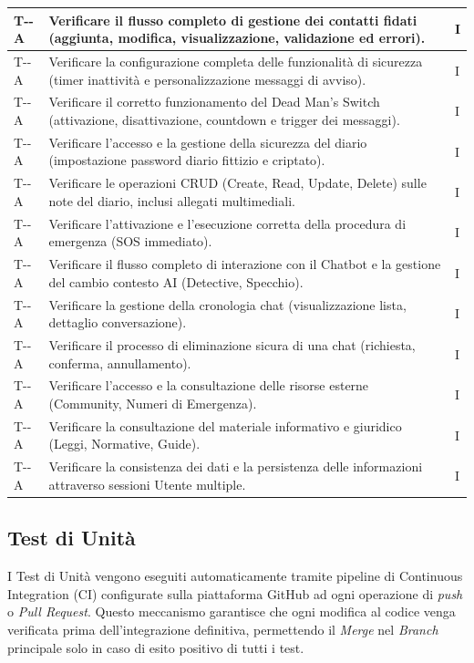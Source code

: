 \documentclass[a4paper,12pt]{article}
\newcounter{testacc}
\newcommand{\acctestcode}{T-\arabic{testacc}-A}
\newcommand{\ignoreglossary}{}
\begin{document}
\begin{longtable}{| >{\centering\arraybackslash}p{} | >{\raggedright\arraybackslash}p{} | >{\centering\arraybackslash}p{} |}
\stepcounter{testacc} \acctestcode & Verificare il flusso completo di gestione dei contatti fidati (aggiunta, modifica, visualizzazione, \ignoreglossary{validazione} ed errori). & I \\
\hline
\stepcounter{testacc} \acctestcode & Verificare la configurazione completa delle funzionalità di sicurezza (timer inattività e personalizzazione messaggi di avviso). & I \\
\hline
\stepcounter{testacc} \acctestcode & Verificare il corretto funzionamento del Dead Man's Switch (attivazione, disattivazione, countdown e trigger dei messaggi). & I \\
\hline
\stepcounter{testacc} \acctestcode & Verificare l'accesso e la gestione della sicurezza del diario (impostazione password diario fittizio e criptato). & I \\
\hline
\stepcounter{testacc} \acctestcode & Verificare le operazioni CRUD (Create, Read, Update, Delete) sulle note del diario, inclusi allegati multimediali. & I \\
\hline
\stepcounter{testacc} \acctestcode & Verificare l'attivazione e l'esecuzione corretta della procedura di emergenza (SOS immediato). & I \\
\hline
\stepcounter{testacc} \acctestcode & Verificare il flusso completo di interazione con il Chatbot e la gestione del cambio contesto AI (Detective, Specchio). & I \\
\hline
\stepcounter{testacc} \acctestcode & Verificare la gestione della cronologia chat (visualizzazione lista, dettaglio conversazione). & I \\
\hline
\stepcounter{testacc} \acctestcode & Verificare il \ignoreglossary{processo} di eliminazione sicura di una chat (richiesta, conferma, annullamento). & I \\
\hline
\stepcounter{testacc} \acctestcode & Verificare l'accesso e la consultazione delle risorse esterne (Community, Numeri di Emergenza). & I \\
\hline
\stepcounter{testacc} \acctestcode & Verificare la consultazione del materiale informativo e giuridico (Leggi, Normative, Guide). & I \\
\hline
\stepcounter{testacc} \acctestcode & Verificare la consistenza dei dati e la persistenza delle informazioni attraverso sessioni Utente multiple. & I \\
\hline
\end{longtable}
\endgroup

\subsection{Test di Unità}
I Test di Unità vengono eseguiti automaticamente tramite pipeline di Continuous Integration (CI) configurate sulla piattaforma GitHub ad ogni operazione di \textit{push} o \textit{Pull Request}. Questo meccanismo garantisce che ogni modifica al codice venga verificata prima dell'integrazione definitiva, permettendo il \textit{Merge} nel \textit{Branch} principale solo in caso di esito positivo di tutti i test.
\end{document}
